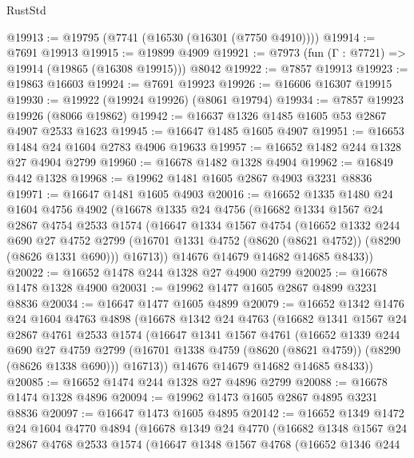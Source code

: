 \begin{lexlean}{RustStd}
\begin{coremodule}
@19913 := @19795 (@7741 (@16530 (@16301 (@7750 @4910))))
@19914 := @7691 @19913
@19915 := @19899 @4909
@19921 := @7973 (fun (Γ : @7721) => @19914 (@19865 (@16308 @19915))) @8042
@19922 := @7857 @19913
@19923 := @19863 @16603
@19924 := @7691 @19923
@19926 := @16606 @16307 @19915
@19930 := @19922 (@19924 @19926) (@8061 @19794)
@19934 := @7857 @19923 @19926 (@8066 @19862)
@19942 := @16637 @1326 @1485 @1605 @53 @2867 @4907 @2533 @1623
@19945 := @16647 @1485 @1605 @4907
@19951 := @16653 @1484 @24 @1604 @2783 @4906 @19633
@19957 := @16652 @1482 @244 @1328 @27 @4904 @2799
@19960 := @16678 @1482 @1328 @4904
@19962 := @16849 @442 @1328
@19968 := @19962 @1481 @1605 @2867 @4903 @3231 @8836
@19971 := @16647 @1481 @1605 @4903
@20016 := @16652
    @1335
    @1480
    @24
    @1604
    @4756
    @4902
    (@16678
      @1335
      @24
      @4756
      (@16682
        @1334
        @1567
        @24
        @2867
        @4754
        @2533
        @1574
        (@16647
          @1334
          @1567
          @4754
          (@16652
            @1332
            @244
            @690
            @27
            @4752
            @2799
            (@16701 @1331 @4752 (@8620 (@8621 @4752)) (@8290 (@8626 @1331 @690)))
            @16713))
        @14676
        @14679
        @14682
        @14685
        @8433))
@20022 := @16652 @1478 @244 @1328 @27 @4900 @2799
@20025 := @16678 @1478 @1328 @4900
@20031 := @19962 @1477 @1605 @2867 @4899 @3231 @8836
@20034 := @16647 @1477 @1605 @4899
@20079 := @16652
    @1342
    @1476
    @24
    @1604
    @4763
    @4898
    (@16678
      @1342
      @24
      @4763
      (@16682
        @1341
        @1567
        @24
        @2867
        @4761
        @2533
        @1574
        (@16647
          @1341
          @1567
          @4761
          (@16652
            @1339
            @244
            @690
            @27
            @4759
            @2799
            (@16701 @1338 @4759 (@8620 (@8621 @4759)) (@8290 (@8626 @1338 @690)))
            @16713))
        @14676
        @14679
        @14682
        @14685
        @8433))
@20085 := @16652 @1474 @244 @1328 @27 @4896 @2799
@20088 := @16678 @1474 @1328 @4896
@20094 := @19962 @1473 @1605 @2867 @4895 @3231 @8836
@20097 := @16647 @1473 @1605 @4895
@20142 := @16652
    @1349
    @1472
    @24
    @1604
    @4770
    @4894
    (@16678
      @1349
      @24
      @4770
      (@16682
        @1348
        @1567
        @24
        @2867
        @4768
        @2533
        @1574
        (@16647
          @1348
          @1567
          @4768
          (@16652
            @1346
            @244

\end{coremodule}
\end{lexlean}
